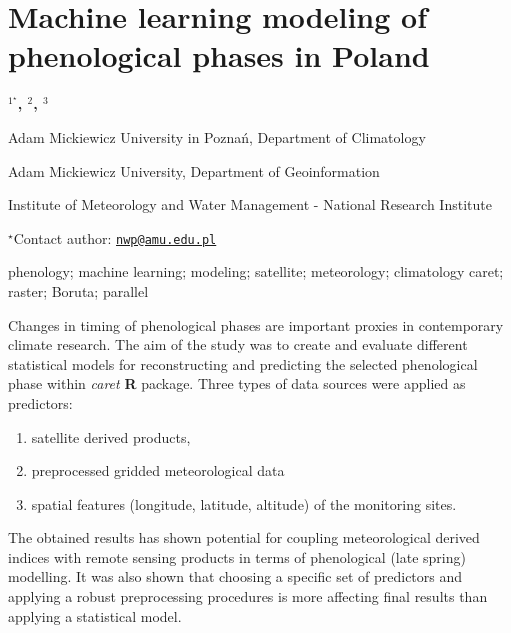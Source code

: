 \documentclass[\main/boa.tex]{subfiles}
\begin{document}
\section{Machine learning modeling of phenological phases in Poland}

\begin{center}
  {\bf {}$^{1^\star}$, $^{2}$, $^{3}$}
\end{center}

\vskip 0.3cm

\begin{affiliations}
\begin{enumerate}
\begin{minipage}{0.915\textwidth}
\centering
\item Adam Mickiewicz University in Poznań, Department of Climatology \\[-2pt]
\item Adam Mickiewicz University, Department of Geoinformation \\[-2pt]
\item Institute of Meteorology and Water Management - National Research
Institute \\[-2pt]
\end{minipage}
\end{enumerate}
$^\star$Contact author: \href{mailto:nwp@amu.edu.pl}{\nolinkurl{nwp@amu.edu.pl}}\\
\end{affiliations}

\vskip 0.5cm

\begin{minipage}{0.915\textwidth}
\keywords phenology; machine learning; modeling; satellite; meteorology;
climatology
\packages caret; raster; Boruta; parallel
\end{minipage}

\vskip 0.8cm

Changes in timing of phenological phases are important proxies in
contemporary climate research. The aim of the study was to create and
evaluate different statistical models for reconstructing and predicting
the selected phenological phase within \emph{caret} \textbf{R} package.
Three types of data sources were applied as predictors:

\begin{enumerate}
\def\labelenumi{\roman{enumi}.}
\tightlist
\item
  satellite derived products,
\item
  preprocessed gridded meteorological data
\item
  spatial features (longitude, latitude, altitude) of the monitoring
  sites.
\end{enumerate}

The obtained results has shown potential for coupling meteorological
derived indices with remote sensing products in terms of phenological
(late spring) modelling. It was also shown that choosing a specific set
of predictors and applying a robust preprocessing procedures is more
affecting final results than applying a statistical model.
\end{document}
